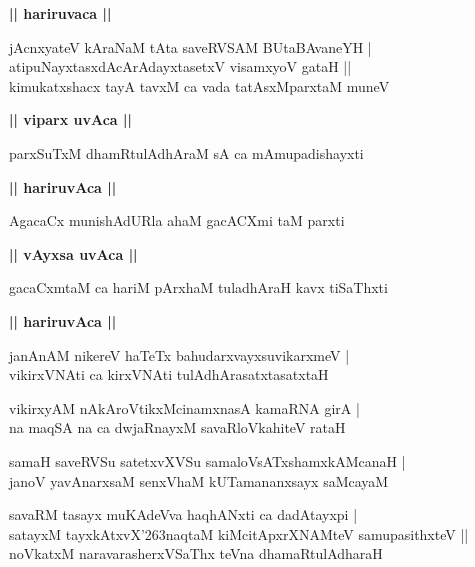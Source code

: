 \documentclass[twoside,12pt,openright]{book}
\def\S{\char'263}
\newcounter{shloka}[chapter]
\def\uvaca#1{\centerline{{\large\textbf{#1}}}}
\begin{document}
\uvaca{|| hariruvaca ||}

\begin{shloka}%
jAcnxyateV kAraNaM tAta saveRVSAM BUtaBAvaneYH |\\
atipuNayxtasxdAcArAdayxtasetxV visamxyoV gataH ||\\
kimukatxshacx tayA tavxM ca vada tatAsxMparxtaM muneV 
\end{shloka}

\uvaca{|| viparx uvAca ||}

\begin{shloka}%
parxSuTxM dhamRtulAdhAraM sA ca mAmupadishayxti 
\end{shloka}

\uvaca{|| hariruvAca ||}

\begin{shloka}%
AgacaCx munishAdURla ahaM gacACXmi taM parxti
\end{shloka}

\uvaca{|| vAyxsa uvAca ||}

\begin{shloka}%
gacaCxmtaM ca hariM pArxhaM tuladhAraH kavx tiSaThxti
\end{shloka}

\uvaca{|| hariruvAca ||}

\begin{shloka}%
janAnAM nikereV haTeTx bahudarxvayxsuvikarxmeV |\\
vikirxVNAti ca kirxVNAti tulAdhArasatxtasatxtaH 
\end{shloka}

\begin{shloka}%
vikirxyAM nAkAroVtikxMcinamxnasA kamaRNA girA |\\
na maqSA na ca dwjaRnayxM savaRloVkahiteV rataH 
\end{shloka}

\begin{shloka}%
samaH saveRVSu satetxvXVSu samaloVsATxshamxkAMcanaH |\\
janoV yavAnarxsaM senxVhaM kUTamananxsayx saMcayaM 
\end{shloka}

\begin{shloka}%
savaRM tasayx muKAdeVva haqhANxti ca dadAtayxpi |\\
satayxM tayxkAtxvX\S naqtaM kiMcitApxrXNAMteV samupasithxteV ||\\
noVkatxM naravarasherxVSaThx teVna dhamaRtulAdharaH 
\end{shloka}
\end{document}
